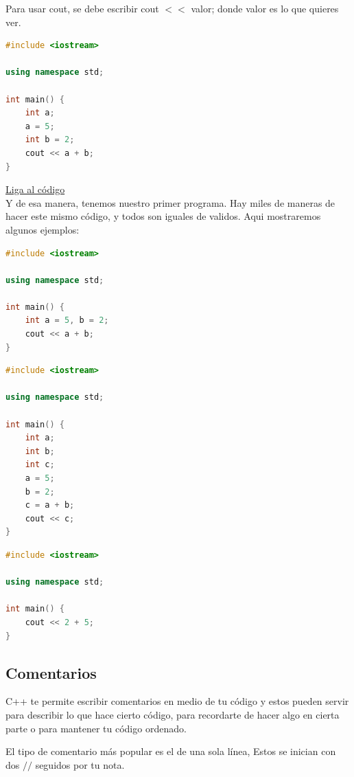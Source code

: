 \documentclass{article}
\begin{document}
Para usar cout, se debe escribir cout $<<$ valor; donde valor es lo que quieres ver.

\begin{lstlisting}[language=C++, caption=Tu primer programa]
#include <iostream>

using namespace std;

int main() {
    int a;
    a = 5;
    int b = 2;
    cout << a + b;
}
\end{lstlisting}
\href{https://repl.it/@Jamesscn/Mi-primer-programa}{Liga al código}\\

Y de esa manera, tenemos nuestro primer programa. Hay miles de maneras de hacer este mismo código, y todos son iguales de validos. Aqui mostraremos algunos ejemplos:

\begin{lstlisting}[language=C++, caption=¿El mismo programa?]
#include <iostream>

using namespace std;

int main() {
    int a = 5, b = 2;
    cout << a + b;
}
\end{lstlisting}

\begin{lstlisting}[language=C++, caption=¿El mismo programa?]
#include <iostream>

using namespace std;

int main() {
    int a;
    int b;
    int c;
    a = 5;
    b = 2;
    c = a + b;
    cout << c;
}
\end{lstlisting}

\begin{lstlisting}[language=C++, caption=¿El mismo programa?]
#include <iostream>

using namespace std;

int main() {
    cout << 2 + 5;
}
\end{lstlisting}

\subsection{Comentarios}

C++ te permite escribir comentarios en medio de tu código y estos pueden servir para describir lo que hace cierto código, para recordarte de hacer algo en cierta parte o para mantener tu código ordenado.

El tipo de comentario más popular es el de una sola línea, Estos se inician con dos $//$ seguidos por tu nota.
\end{document}
